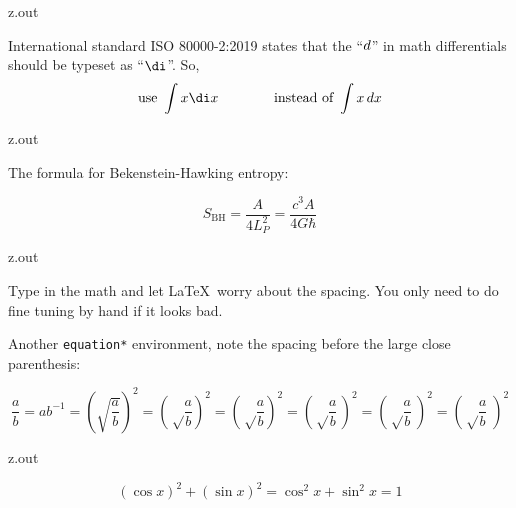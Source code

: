 \MyIO


\begin{VerbatimOut}{z.out}

International standard ISO 80000-2:2019
\cite{iso8000022019}
states that the ``$d\/$'' in math differentials
should be typeset as ``$\di$''.
So,
\begin{equation*}
  \text{use } \int x\di x\qquad\qquad \text{instead of } \int x\,dx
\end{equation*}
\end{VerbatimOut}

\MyIO


\begin{VerbatimOut}{z.out}

The formula for Bekenstein-Hawking entropy:

\begin{equation*}
  S_\text{BH}
  =
  \frac A {4L_P^2}
  = \frac {c^3A} {4G\hbar}
\end{equation*}
\end{VerbatimOut}

\MyIO


\begin{VerbatimOut}{z.out}

Type in the math and let \LaTeX\ worry about the spacing.
You only need to do fine tuning by hand if it looks bad.

Another \verb+equation*+ environment,
note the spacing before the large close parenthesis:

\begin{equation*}
  \frac ab
    = ab^{-1}
    = (\sqrt{\frac ab})^2
    = \left( \sqrt\frac ab \right)^2
    = \left( \sqrt\frac ab \!\right)^2
    = \left( \sqrt\frac ab \,\right)^2
    = \left( \sqrt\frac ab \:\right)^2
    = \left( \sqrt\frac ab \;\right)^2
\end{equation*}
\end{VerbatimOut}

\MyIO


\begin{VerbatimOut}{z.out}

\begin{equation*}
  (\cos x)^2 + (\sin x)^2 = \cos^2 x + \sin^2 x = 1
\end{equation*}
\end{VerbatimOut}

